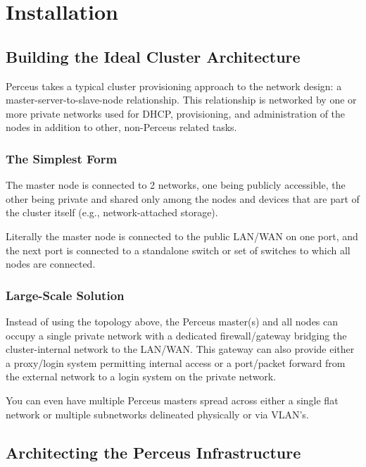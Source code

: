 \documentclass[10pt,letterpaper]{report}
\begin{document}
\chapter{Installation}

\section{Building the Ideal Cluster Architecture}

Perceus takes a typical cluster provisioning approach to the network design: a
master-server-to-slave-node relationship.  This relationship is networked by
one or more private networks used for DHCP, provisioning, and administration of
the nodes in addition to other, non-Perceus related tasks.

\subsection{The Simplest Form}

The master node is connected to 2 networks, one being publicly accessible, the
other being private and shared only among the nodes and devices that are part
of the cluster itself (e.g., network-attached storage).

Literally the master node is connected to the public LAN/WAN on one port, and
the next port is connected to a standalone switch or set of switches to which
all nodes are connected.

\subsection{Large-Scale Solution}

Instead of using the topology above, the Perceus master(s) and all nodes can
occupy a single private network with a dedicated firewall/gateway bridging the
cluster-internal network to the LAN/WAN.  This gateway can also provide either
a proxy/login system permitting internal access or a port/packet forward from
the external network to a login system on the private network.

You can even have multiple Perceus masters spread across either a single flat
network or multiple subnetworks delineated physically or via VLAN's.


\section{Architecting the Perceus Infrastructure}
\end{document}
